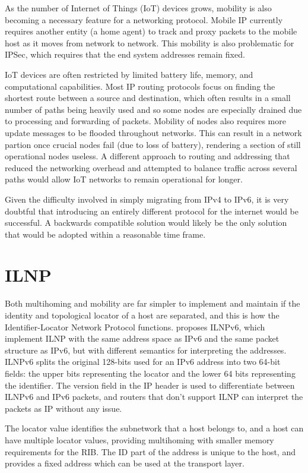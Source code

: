 \documentclass[12pt]{article}
\begin{document}
As the number of Internet of Things (IoT) devices grows, mobility is also becoming a necessary feature for a networking protocol. Mobile IP currently requires another entity (a home agent) to track and proxy packets to the mobile host as it moves from network to network. This mobility is also problematic for IPSec, which requires that the end system addresses remain fixed.

IoT devices are often restricted by limited battery life, memory, and computational capabilities. Most IP routing protocols focus on finding the shortest route between a source and destination, which often results in a small number of paths being heavily used and so some nodes are especially drained due to processing and forwarding of packets. Mobility of nodes also requires more update messages to be flooded throughout networks. This can result in a network partion once crucial nodes fail (due to loss of battery), rendering a section of still operational nodes useless. A different approach to routing and addressing that reduced the networking overhead and attempted to balance traffic across several paths would allow IoT networks to remain operational for longer. 

Given the difficulty involved in simply migrating from IPv4 to IPv6, it is very doubtful that introducing an entirely different protocol for the internet would be successful. A backwards compatible solution would likely be the only solution that would be adopted within a reasonable time frame.

\section{ILNP}

Both multihoming and mobility are far simpler to implement and maintain if the identity and topological locator of a host are separated, and this is how the Identifier-Locator Network Protocol functions. \cite{5586444} proposes ILNPv6, which implement ILNP with the same address space as IPv6 and the same packet structure as IPv6, but with different semantics for interpreting the addresses. ILNPv6 splits the original 128-bits used for an IPv6 address into two 64-bit fields: the upper bits representing the locator and the lower 64 bits representing the identifier. The version field in the IP header is used to differentiate between ILNPv6 and IPv6 packets, and routers that don't support ILNP can interpret the packets as IP without any issue. 

The locator value identifies the subnetwork that a host belongs to, and a host can have multiple locator values, providing multihoming with smaller memory requirements for the RIB. The ID part of the address is unique to the host, and provides a fixed address which can be used at the transport layer.
\end{document}
